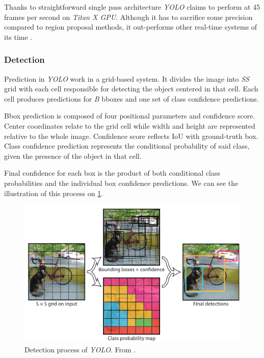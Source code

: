 Thanks to straightforward single pass architecture \textit{YOLO} claims to perform at 45 frames per second on \textit{Titan X GPU}. Although it has to sacrifice some precision compared to region proposal methods, it out-performs other real-time systems of its time \cite{bib:overfeat}.


\subsubsection{Detection}
Prediction in \textit{YOLO} work in a grid-based system. It divides the image into \textit{S\x S} grid with each cell responsible for detecting the object centered in that cell.  Each cell produces predictions for \textit{B} bboxes and one set of class confidence predictions. 

Bbox prediction is composed of four positional parameters and confidence score. Center coordinates relate to the grid cell while width and height are represented relative to the whole image. Confidence score reflects IoU with ground-truth box. Class confidence prediction represents the conditional probability of said class, given the presence of the object in that cell. 

Final confidence for each box is the product of both conditional class probabilities and the individual box confidence predictions. We can see the illustration of this process on \cref{fig:yoloDet}.

\begin{figure}
    \centering
    \includegraphics[width=\textwidth]{img/yoloDet}
    \caption[YOLO detection]%
    {Detection process of \textit{YOLO}. From \cite[fig. 2]{bib:yolo}.}
    \label{fig:yoloDet} 
\end{figure}


